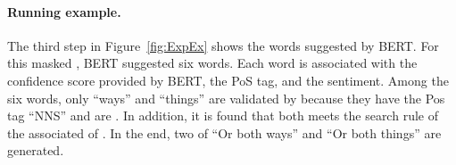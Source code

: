 \paragraph{Running example.} The third step in Figure~\ref{fig:ExpEx} shows the words suggested
by BERT. For this masked \sent, BERT suggested six words. Each word is
associated with the confidence score provided by BERT, the PoS tag,
and the sentiment. Among the six words, only ``ways'' and ``things''
are validated by \tool{} because they have the Pos tag ``NNS'' and are
\neu. In addition, it is found that both \sents meets the search rule
of the associated \lc of \SareqExOne. In the end, two \sents of ``Or
both ways'' and ``Or both things'' are generated.



